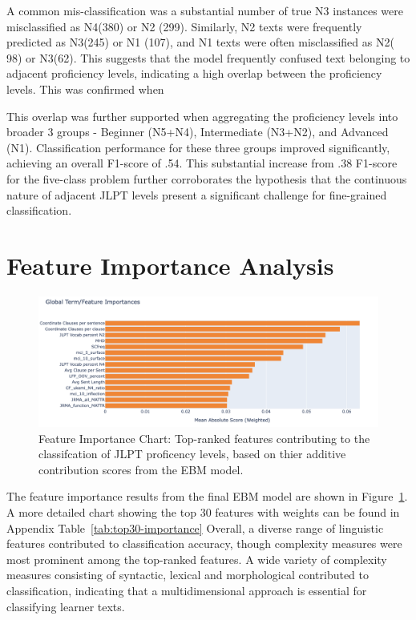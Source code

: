 A common mis-classification was a substantial number of true N3 instances were misclassified as N4(380) or N2 (299).
Similarly, N2 texts were frequently predicted as N3(245) or N1 (107), and N1 texts were often misclassified as N2(
98) or N3(62). This suggests that the model frequently confused text belonging to adjacent proficiency levels,
indicating a high overlap between the proficiency levels. This was confirmed when

This overlap was further supported when aggregating the proficiency levels into broader 3 groups - Beginner (N5+N4),
Intermediate (N3+N2), and
Advanced (N1).
Classification performance for these three groups improved significantly, achieving an overall F1-score of .54. This
substantial increase from .38 F1-score for the five-class problem further corroborates the hypothesis that the
continuous nature of adjacent JLPT levels present a significant challenge for fine-grained classification.

\section{Feature Importance Analysis}
\begin{figure}[h!]
    \centering
    \includegraphics[scale=.4]{img/feature_importance}
    \caption[Feature Importance Chart]{ Feature Importance Chart: Top-ranked features contributing to the classifcation of JLPT proficency levels, based on thier additive contribution scores from the EBM model.}
    \label{fig:featureimportance}
\end{figure}


The feature importance results from the final EBM model are shown in Figure~\ref{fig:featureimportance}. A
more detailed chart showing the top 30 features with weights can be found in Appendix Table~\ref{tab:top30-importance}
Overall, a
diverse range of linguistic features contributed to classification accuracy, though complexity measures were most
prominent among the top-ranked features. A wide variety of complexity
measures consisting of syntactic, lexical and morphological contributed to classification, indicating that a
multidimensional approach is essential for classifying learner texts.


